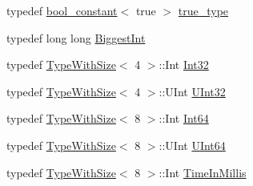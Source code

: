 \begin{DoxyCompactItemize}
typedef \mbox{\hyperlink{structtesting_1_1internal_1_1bool__constant}{bool\+\_\+constant}}$<$ true $>$ \mbox{\hyperlink{namespacetesting_1_1internal_a62f917c3424d8841de9b49b5ec28edb4}{true\+\_\+type}}
\item 
typedef long long \mbox{\hyperlink{namespacetesting_1_1internal_a05c6bd9ede5ccdf25191a590d610dcc6}{Biggest\+Int}}
\item 
typedef \mbox{\hyperlink{classtesting_1_1internal_1_1TypeWithSize}{Type\+With\+Size}}$<$ 4 $>$\+::Int \mbox{\hyperlink{namespacetesting_1_1internal_a8ee38faaf875f133358abaf9bc056cec}{Int32}}
\item 
typedef \mbox{\hyperlink{classtesting_1_1internal_1_1TypeWithSize}{Type\+With\+Size}}$<$ 4 $>$\+::U\+Int \mbox{\hyperlink{namespacetesting_1_1internal_a40d4fffcd2bf56f18b1c380615aa85e3}{U\+Int32}}
\item 
typedef \mbox{\hyperlink{classtesting_1_1internal_1_1TypeWithSize}{Type\+With\+Size}}$<$ 8 $>$\+::Int \mbox{\hyperlink{namespacetesting_1_1internal_a271c563fec38b804ddab0677f51f70a8}{Int64}}
\item 
typedef \mbox{\hyperlink{classtesting_1_1internal_1_1TypeWithSize}{Type\+With\+Size}}$<$ 8 $>$\+::U\+Int \mbox{\hyperlink{namespacetesting_1_1internal_aa6a1ac454e6d7e550fa4925c62c35caa}{U\+Int64}}
\item 
typedef \mbox{\hyperlink{classtesting_1_1internal_1_1TypeWithSize}{Type\+With\+Size}}$<$ 8 $>$\+::Int \mbox{\hyperlink{namespacetesting_1_1internal_a66a845df404b38fe85c5e14a069f255a}{Time\+In\+Millis}}
\end{DoxyCompactItemize}
